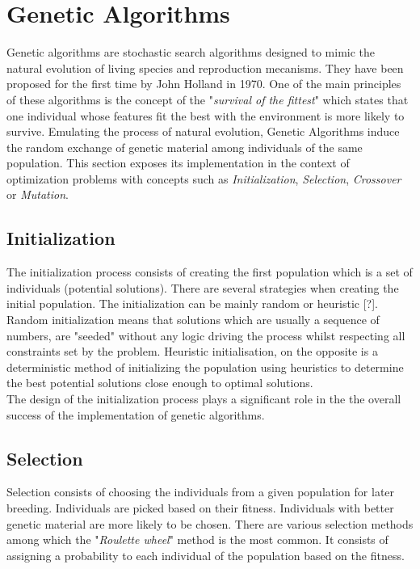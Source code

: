 \documentclass[twocolumn,10pt]{asme2ej}
\begin{document}
\section{Genetic Algorithms}
Genetic algorithms are stochastic search algorithms designed to mimic the natural evolution of living species and reproduction mecanisms. They have been proposed for the first time by John Holland \cite{john_h_paper} in 1970. One of the main principles of these algorithms is the concept of the "\emph{survival of the fittest}" which states that one individual whose features fit the best with the environment is more likely to survive. Emulating the process of natural evolution, Genetic Algorithms induce the random exchange of genetic material among individuals of the same population.
This section exposes its implementation in the context of optimization problems with concepts such as \emph{Initialization}, \emph{Selection}, \emph{Crossover} or \emph{Mutation}.
 
\subsection{Initialization}
The initialization process consists of creating the first population which is a set of individuals (potential solutions). There are several strategies when creating the initial population. The initialization can be mainly random or heuristic [?]. Random initialization means that solutions which are usually a sequence of numbers, are "seeded" without any logic driving the process whilst respecting all constraints set by the problem. 
Heuristic initialisation, on the opposite is a deterministic method of initializing the population using heuristics to determine the best potential solutions close enough to optimal solutions. \\
The design of the initialization process plays a significant role in the the overall success of the implementation of genetic algorithms.

\subsection{Selection}
Selection consists of choosing the individuals from a given population for later breeding. Individuals are picked based on their fitness. Individuals with better genetic material are more likely to be chosen. There are various selection methods among which the "\emph{Roulette wheel}" method is the most common. It consists of assigning a probability to each individual of the population based on the fitness.
\end{document}
